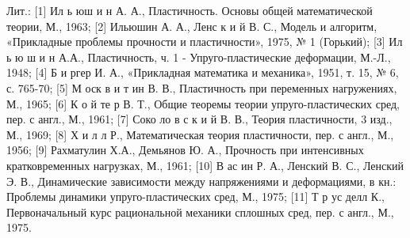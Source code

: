 \documentclass[10pt]{article}
\begin{document}
Лит.: [1] Ил ь юш и н А. А., Пластичность. Основы общей математической теории, М., 1963; [2] Ильюшин А. А., Ленс к и й В. С., Модель и алгоритм, «Прикладные проблемы прочности и пластичности», 1975, № 1 (Горький); [3] Ил ь ю ш и н А.А., Пластичность, ч. 1 - Упруго-пластические деформации, М.-Л., 1948; [4] Б и ргер И. А., «Прикладная математика и механика», 1951, т. 15, № 6, с. 765-70; [5] М оск в и т ин В. В., Пластичность при переменных нагружениях, М., 1965; [6] К о й те р В. Т., Общие теоремы теории упруго-пластических сред, пер. с англ., М., 1961; [7] Соко ло в с к и й В. В., Теория пластичности, 3 изд., М., 1969; [8] Х и л л Р., Математическая теория пластичности, пер. с англ., М., 1956; [9] Рахматулин Х.А., Демьянов Ю. А., Прочность при интенсивных кратковременных нагрузках, М., 1961; [10] В ас ин Р. А., Ленский В. С., Ленский Э. В., Динамические зависимости между напряжениями и деформациями, в кн.: Проблемы динамики упруго-пластических сред, М., 1975; [11] Т р ус делл К., Первоначальный курс рациональной механики сплошных сред, пер. с англ., М., 1975.
\end{document}
